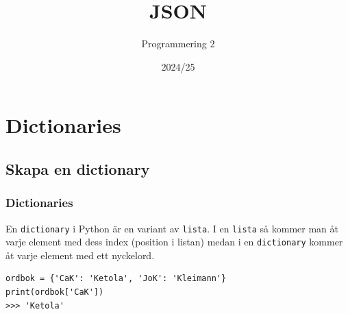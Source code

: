 \documentclass[aspectratio=169]{beamer}
\begin{document}



\title{JSON}
\date{2024/25}
\author{Programmering 2}

\maketitle

\section{Dictionaries}

\subsection{Skapa en dictionary}

\begin{frame}[fragile]
\frametitle{Dictionaries}

En \lstinline{dictionary} i Python är en variant av \texttt{lista}. I en \texttt{lista} så kommer man åt varje element med dess index (position i listan) medan i en \lstinline{dictionary} kommer åt varje element med ett nyckelord.

\begin{lstlisting}
ordbok = {'CaK': 'Ketola', 'JoK': 'Kleimann'}
print(ordbok['CaK'])
>>> 'Ketola'
\end{lstlisting}

\end{frame}
\end{document}
